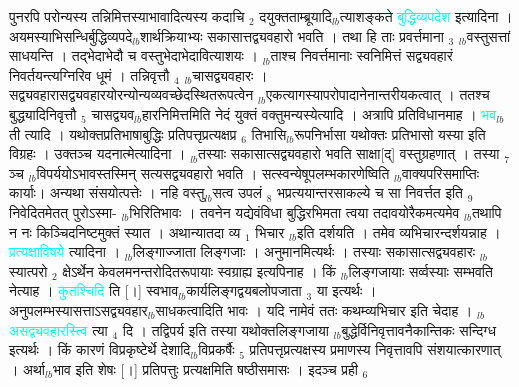 \documentclass[article,12pt,a4paper]{memoir}%
\newcommand{\quotelemma}[1]{\textcolor{cyan}{#1}}
\begin{document}
	  
	  \pstart \leavevmode%
	पुनरपि परोन्यस्य तन्निमित्तस्याभावादित्यस्य कदाचि {\tiny $_{2}$} दयुक्तताम्ब्रूयादि{\tiny $_{lb}$}त्याशङ्कते \quotelemma{बुद्धिव्यपदेश} \cite[2b3]{vn-msN} इत्यादिना । अयमस्याभिसन्धिर्बुद्धिव्यपदे{\tiny $_{lb}$}शार्थक्रियाभ्यः सकासात्तद्व्यवहारो भवति । तथा हि ताः प्रवर्त्तमाना {\tiny $_{3}$} {\tiny $_{lb}$}वस्तुसत्तां साधयन्ति । तद्भेदाभेदौ च वस्तुभेदाभेदावित्याशयः । {\tiny $_{lb}$}ताश्च निवर्त्तमानाः स्वनिमित्तं सद्व्यवहारं निवर्तयन्त्यग्निरिव धूमं । तन्निवृत्तौ {\tiny $_{4}$} {\tiny $_{lb}$}चासद्व्यवहारः । सद्व्यवहारासद्व्यवहारयोरन्योन्यव्यवच्छेदस्थितरूपत्वेन {\tiny $_{lb}$}एकत्यागस्यापरोपादानेनान्तरीयकत्वात् । ततश्च बुद्ध्यादिनिवृत्तौ {\tiny $_{5}$} चासद्व्यव{\tiny $_{lb}$}हारनिमित्तमिति नेदं युक्तं वक्तुमन्यस्येत्यादि । अत्रापि प्रतिविधानमाह । \quotelemma{भव}{\tiny $_{lb}$} \leavevmode{} ती \cite[2b4]{vn-msN} त्यादि । यथोक्तप्रतिभाषाबुद्धिः प्रतिपत्तृप्रत्यक्षप्र {\tiny $_{6}$} तिभासि{\tiny $_{lb}$}रूपनिर्भासा यथोक्तः प्रतिभासो यस्या इति विग्रहः । उक्तञ्च यदनात्मेत्यादिना । {\tiny $_{lb}$}तस्याः सकासात्सद्व्यवहारो भवति साक्षा[द्] वस्तुग्रहणात् । तस्या {\tiny $_{7}$} ञ्च {\tiny $_{lb}$}विपर्ययोऽभावस्तस्मिन् सत्यसद्व्यवहारो भवति । सत्स्वन्येषूपलम्भकारणेष्विति {\tiny $_{lb}$}वाक्यपरिसमाप्तिः कार्याः। अन्यथा संसयोत्पत्तेः । नहि वस्तु{\tiny $_{lb}$}सत्व उपलं {\tiny $_{8}$} भप्रत्ययान्तरसाकल्ये च सा निवर्त्तत इति {\tiny $_{9}$} \leavevmode{} निवेदितमेतत् पुरोऽस्मा- {\tiny $_{lb}$}भिरितिभावः । तवनेन यद्येवंविधा बुद्धिरभिमता त्वया तदावयोरैकमत्यमेव {\tiny $_{lb}$}तथापि न नः किञ्चिदनिष्टमुक्तं स्यात । अथान्यातदा व्य {\tiny $_{1}$} भिचार {\tiny $_{lb}$}इति दर्शयति । तमेव व्यभिचारन्दर्शयन्नाह । \quotelemma{प्रत्यक्षाविषये} \cite[2b4]{vn-msN} त्यादिना । {\tiny $_{lb}$}लिङ्गाज्जाता लिङ्गजाः । अनुमानमित्यर्थः । तस्याः सकासात्सद्व्यवहारः {\tiny $_{lb}$}स्यात्परो {\tiny $_{2}$} क्षेऽर्थेन केवलमनन्तरोदितरूपायाः स्वग्राह्य इत्यपिनाह । किं {\tiny $_{lb}$}लिङ्गजायाः सर्व्वस्याः सम्भवति नेत्याह । \quotelemma{कुतश्चिदि} \cite[2b4]{vn-msN} ति [।] स्वभाव{\tiny $_{lb}$}कार्यलिङ्गद्वयबलोपजाता {\tiny $_{3}$} या इत्यर्थः । अनुपलम्भस्यासत्ताऽसद्व्यवहार{\tiny $_{lb}$}साधकत्वादिति भावः । यदि नामेवं ततः कथम्व्यभिचार इति चेदाह । {\tiny $_{lb}$} \quotelemma{असद्व्यवहारस्त्वि} \cite[2b4]{vn-msN} त्या {\tiny $_{4}$} दि । तद्विपर्य इति तस्या यथोक्तलिङ्गजाया {\tiny $_{lb}$}बुद्धेर्विनिवृत्तावनैकान्तिकः सन्दिग्ध इत्यर्थः । किं कारणं विप्रकृष्टेर्थे देशादि{\tiny $_{lb}$}विप्रकर्षैः {\tiny $_{5}$} प्रतिपत्तृप्रत्यक्षस्य प्रमाणस्य निवृत्तावपि संशयात्कारणात् । अर्था{\tiny $_{lb}$}भाव इति शेषः [।] प्रतिपत्तुः प्रत्यक्षमिति षष्ठीसमासः । इदञ्च प्रही {\tiny $_{6}$} 
\end{document}

